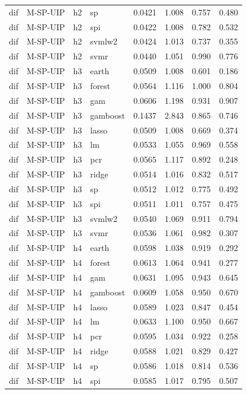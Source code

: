 \begin{ThreePartTable}
\begin{longtable}[t]{llclcccc}
dif & M-SP-UIP & h2 & sp & 0.0421 & 1.008 & 0.757 & 0.480\\
dif & M-SP-UIP & h2 & spi & 0.0422 & 1.008 & 0.782 & 0.532\\
dif & M-SP-UIP & h2 & svmlw2 & 0.0424 & 1.013 & 0.737 & 0.355\\
dif & M-SP-UIP & h2 & svmr & 0.0440 & 1.051 & 0.990 & 0.776\\
\addlinespace
dif & M-SP-UIP & h3 & earth & 0.0509 & 1.008 & 0.601 & 0.186\\
dif & M-SP-UIP & h3 & forest & 0.0564 & 1.116 & 1.000 & 0.804\\
dif & M-SP-UIP & h3 & gam & 0.0606 & 1.198 & 0.931 & 0.907\\
dif & M-SP-UIP & h3 & gamboost & 0.1437 & 2.843 & 0.865 & 0.746\\
dif & M-SP-UIP & h3 & lasso & 0.0509 & 1.008 & 0.669 & 0.374\\
dif & M-SP-UIP & h3 & lm & 0.0533 & 1.055 & 0.969 & 0.558\\
dif & M-SP-UIP & h3 & pcr & 0.0565 & 1.117 & 0.892 & 0.248\\
dif & M-SP-UIP & h3 & ridge & 0.0514 & 1.016 & 0.832 & 0.517\\
dif & M-SP-UIP & h3 & sp & 0.0512 & 1.012 & 0.775 & 0.492\\
dif & M-SP-UIP & h3 & spi & 0.0511 & 1.011 & 0.757 & 0.475\\
dif & M-SP-UIP & h3 & svmlw2 & 0.0540 & 1.069 & 0.911 & 0.794\\
dif & M-SP-UIP & h3 & svmr & 0.0536 & 1.061 & 0.982 & 0.307\\
\addlinespace
dif & M-SP-UIP & h4 & earth & 0.0598 & 1.038 & 0.919 & 0.292\\
dif & M-SP-UIP & h4 & forest & 0.0613 & 1.064 & 0.941 & 0.277\\
dif & M-SP-UIP & h4 & gam & 0.0631 & 1.095 & 0.943 & 0.645\\
dif & M-SP-UIP & h4 & gamboost & 0.0609 & 1.058 & 0.950 & 0.670\\
dif & M-SP-UIP & h4 & lasso & 0.0589 & 1.023 & 0.847 & 0.454\\
dif & M-SP-UIP & h4 & lm & 0.0633 & 1.100 & 0.950 & 0.667\\
dif & M-SP-UIP & h4 & pcr & 0.0595 & 1.034 & 0.922 & 0.258\\
dif & M-SP-UIP & h4 & ridge & 0.0588 & 1.021 & 0.829 & 0.427\\
dif & M-SP-UIP & h4 & sp & 0.0586 & 1.018 & 0.814 & 0.536\\
dif & M-SP-UIP & h4 & spi & 0.0585 & 1.017 & 0.795 & 0.507\\

\end{longtable}
\end{ThreePartTable}
